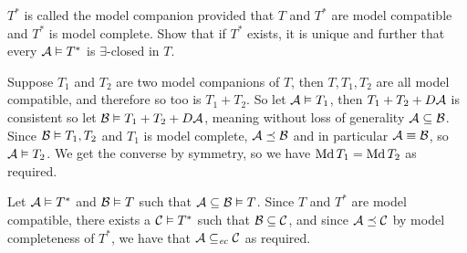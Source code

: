     $T^*$ is called the {\emphcolor model companion} provided that $T$ and $T^*$ are model compatible and $T^*$ is model complete.
    Show that if $T^*$ exists, it is unique and further that every ${\cal A}\vDash T^*$ is $\exists$-closed in $T$.

\eexerc

Suppose $T_1$ and $T_2$ are two model companions of $T$, then $T,T_1,T_2$ are all model compatible, and therefore so too is $T_1+T_2$.
So let ${\cal A}\vDash T_1$, then $T_1+T_2+D{\cal A}$ is consistent so let ${\cal B}\vDash T_1+T_2+D{\cal A}$, meaning without loss of generality ${\cal A}\subseteq{\cal B}$.
Since ${\cal B}\vDash T_1,T_2$ and $T_1$ is model complete, ${\cal A}\preceq{\cal B}$ and in particular ${\cal A}\equiv{\cal B}$, so ${\cal A}\vDash T_2$.
We get the converse by symmetry, so we have $\mathop{\rm Md} T_1=\mathop{\rm Md} T_2$ as required.

Let ${\cal A}\vDash T^*$ and ${\cal B}\vDash T$ such that ${\cal A}\subseteq{\cal B}\vDash T$.
Since $T$ and $T^*$ are model compatible, there exists a ${\cal C}\vDash T^*$ such that ${\cal B}\subseteq{\cal C}$, and since ${\cal A}\preceq{\cal C}$ by model completeness of $T^*$, we have that
${\cal A}\subseteq_{\it ec}{\cal C}$ as required.


